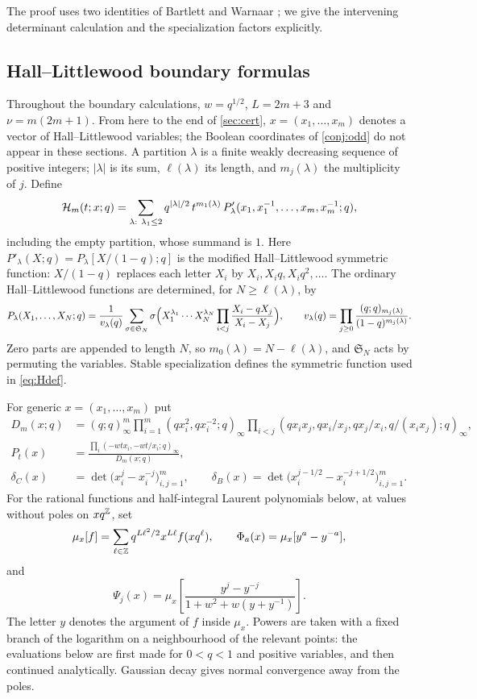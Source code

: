 The proof uses two identities of Bartlett and Warnaar \cite[Theorems~3.7 and 5.2]{BW15}; we give the intervening determinant calculation and the specialization factors explicitly.

\subsection{Hall--Littlewood boundary formulas}
Throughout the boundary calculations, $w=q^{1/2}$, $L=2m+3$ and $\nu=m(2m+1)$. From here to the end of \cref{sec:cert}, $x=(x_1,\dots,x_m)$ denotes a vector of Hall--Littlewood variables; the Boolean coordinates of \cref{conj:odd} do not appear in these sections. A partition $\lambda$ is a finite weakly decreasing sequence of positive integers; $|\lambda|$ is its sum, $\ell(\lambda)$ its length, and $m_j(\lambda)$ the multiplicity of $j$. Define
\begin{equation}\label{eq:Hdef}
\HL_m(t;x;q)=\sum_{\lambda:\ \lambda_1\le2}q^{|\lambda|/2}\,t^{m_1(\lambda)}\,P'_\lambda(x_1,x_1^{-1},\dots,x_m,x_m^{-1};q),
\end{equation}
including the empty partition, whose summand is $1$. Here $P'_\lambda(X;q)=P_\lambda[X/(1-q);q]$ is the modified Hall--Littlewood symmetric function: $X/(1-q)$ replaces each letter $X_i$ by $X_i,X_iq,X_iq^2,\dots$. The ordinary Hall--Littlewood functions are determined, for $N\ge\ell(\lambda)$, by
\[
P_\lambda(X_1,\dots,X_N;q)=\frac1{v_\lambda(q)}\sum_{\sigma\in\mathfrak S_N}\sigma\Bigl(X_1^{\lambda_1}\cdots X_N^{\lambda_N}\prod_{i<j}\frac{X_i-qX_j}{X_i-X_j}\Bigr),\qquad v_\lambda(q)=\prod_{j\ge0}\frac{(q;q)_{m_j(\lambda)}}{(1-q)^{m_j(\lambda)}}.
\]
Zero parts are appended to length $N$, so $m_0(\lambda)=N-\ell(\lambda)$, and $\mathfrak S_N$ acts by permuting the variables. Stable specialization defines the symmetric function used in \eqref{eq:Hdef}.

For generic $x=(x_1,\dots,x_m)$ put
\begin{align*}
D_m(x;q)&=(q;q)_\infty^m\prod_{i=1}^m(qx_i^2,qx_i^{-2};q)_\infty\prod_{i<j}(qx_ix_j,qx_i/x_j,qx_j/x_i,q/(x_ix_j);q)_\infty,\\
P_t(x)&=\frac{\prod_i(-wtx_i,-wt/x_i;q)_\infty}{D_m(x;q)},\\
\delta_C(x)&=\det\bigl(x_i^j-x_i^{-j}\bigr)_{i,j=1}^m,\qquad \delta_B(x)=\det\bigl(x_i^{j-1/2}-x_i^{-j+1/2}\bigr)_{i,j=1}^m.
\end{align*}
For the rational functions and half-integral Laurent polynomials below, at values without poles on $xq^{\mathbb{Z}}$, set
\[
\mu_x[f]=\sum_{\ell\in\mathbb{Z}}q^{L\ell^2/2}x^{L\ell}f(xq^\ell),\qquad \Phi_a(x)=\mu_x[y^a-y^{-a}],
\]
and
\[
\Psi_j(x)=\mu_x\left[\frac{y^j-y^{-j}}{1+w^2+w(y+y^{-1})}\right].
\]
The letter $y$ denotes the argument of $f$ inside $\mu_x$. Powers are taken with a fixed branch of the logarithm on a neighbourhood of the relevant points: the evaluations below are first made for $0<q<1$ and positive variables, and then continued analytically. Gaussian decay gives normal convergence away from the poles.

